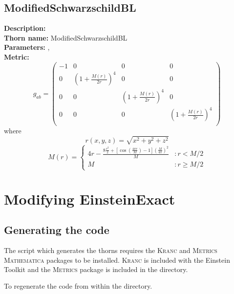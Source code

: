 \documentclass{article}
\begin{document}
\subsection{ModifiedSchwarzschildBL}
{\bf Description:}   \\
{\bf Thorn name:} ModifiedSchwarzschildBL \\
{\bf Parameters:} ,  \\
{\bf Metric:} \\
\begin{equation}
g_{ab} =
\left(
\begin{array}{cccc}
 -1 & 0 & 0 & 0 \\
 0 & \left(1+\frac{M(r)}{2 r}\right)^4 & 0 & 0 \\
 0 & 0 & \left(1+\frac{M(r)}{2 r}\right)^4 & 0 \\
 0 & 0 & 0 & \left(1+\frac{M(r)}{2 r}\right)^4 \\
\end{array}
\right)
\end{equation}
where
\begin{equation}
r(x,y,z)=\sqrt{x^2+y^2+z^2}
\end{equation}
\begin{equation}
M(r) = \left\{
     \begin{array}{lr}
       4 r - \frac{8 \frac{r^2}{2} + [\cos(\frac{4 \pi r}{M}) - 1] \left(\frac{M}{4 \pi}\right)^2}{M} & : r < M/2\\
       M & : r \ge M/2
     \end{array}
   \right.
\end{equation}

\section{Modifying EinsteinExact}

\subsection{Generating the code}
The script which generates the thorns requires the \textsc{Kranc} and
\textsc{Metrics} \textsc{Mathematica} packages to be installed. \textsc{Kranc}
is included with the Einstein Toolkit and the \textsc{Metrics} package is
included in the  directory.

To regenerate the code  from within the  directory.
\end{document}
